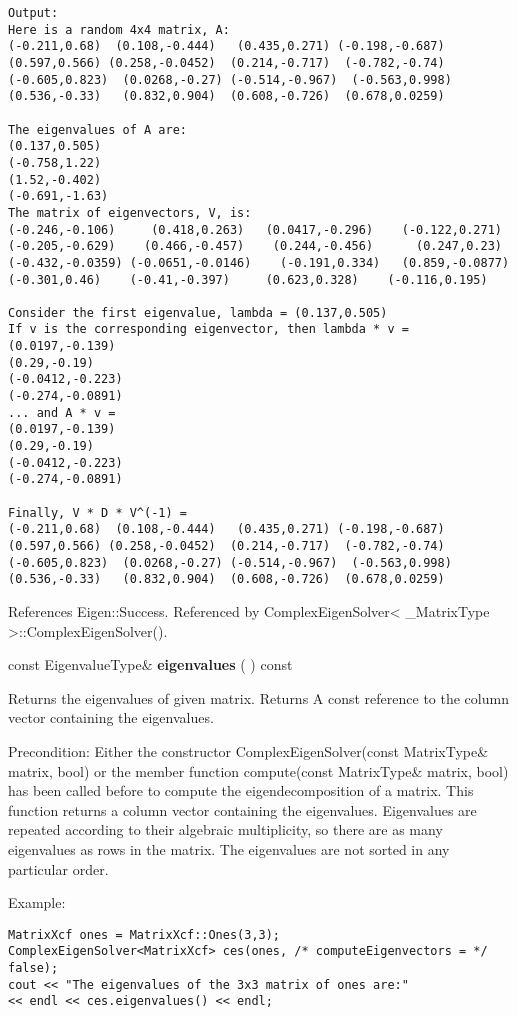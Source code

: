 \begin{verbatim}
Output:
Here is a random 4x4 matrix, A:
(-0.211,0.68)  (0.108,-0.444)   (0.435,0.271) (-0.198,-0.687)
(0.597,0.566) (0.258,-0.0452)  (0.214,-0.717)  (-0.782,-0.74)
(-0.605,0.823)  (0.0268,-0.27) (-0.514,-0.967)  (-0.563,0.998)
(0.536,-0.33)   (0.832,0.904)  (0.608,-0.726)  (0.678,0.0259)

The eigenvalues of A are:
(0.137,0.505)
(-0.758,1.22)
(1.52,-0.402)
(-0.691,-1.63)
The matrix of eigenvectors, V, is:
(-0.246,-0.106)     (0.418,0.263)   (0.0417,-0.296)    (-0.122,0.271)
(-0.205,-0.629)    (0.466,-0.457)    (0.244,-0.456)      (0.247,0.23)
(-0.432,-0.0359) (-0.0651,-0.0146)    (-0.191,0.334)   (0.859,-0.0877)
(-0.301,0.46)    (-0.41,-0.397)     (0.623,0.328)    (-0.116,0.195)

Consider the first eigenvalue, lambda = (0.137,0.505)
If v is the corresponding eigenvector, then lambda * v = 
(0.0197,-0.139)
(0.29,-0.19)
(-0.0412,-0.223)
(-0.274,-0.0891)
... and A * v = 
(0.0197,-0.139)
(0.29,-0.19)
(-0.0412,-0.223)
(-0.274,-0.0891)

Finally, V * D * V^(-1) = 
(-0.211,0.68)  (0.108,-0.444)   (0.435,0.271) (-0.198,-0.687)
(0.597,0.566) (0.258,-0.0452)  (0.214,-0.717)  (-0.782,-0.74)
(-0.605,0.823)  (0.0268,-0.27) (-0.514,-0.967)  (-0.563,0.998)
(0.536,-0.33)   (0.832,0.904)  (0.608,-0.726)  (0.678,0.0259)
\end{verbatim}	

References Eigen::Success.
Referenced by ComplexEigenSolver< \_MatrixType >::ComplexEigenSolver().



\vspace{0.3cm}
const EigenvalueType\& \textbf{eigenvalues}  ( )  const 

Returns the eigenvalues of given matrix. 
Returns A const reference to the column vector containing the eigenvalues.

Precondition: Either the constructor ComplexEigenSolver(const MatrixType\& matrix, bool) or the member function compute(const MatrixType\& matrix, bool) has been called before to compute the eigendecomposition of a matrix.
This function returns a column vector containing the eigenvalues. Eigenvalues are repeated according to their algebraic multiplicity, so there are as many eigenvalues as rows in the matrix. The eigenvalues are not sorted in any particular order.


Example:
\begin{lstlisting}
MatrixXcf ones = MatrixXcf::Ones(3,3);
ComplexEigenSolver<MatrixXcf> ces(ones, /* computeEigenvectors = */ false);
cout << "The eigenvalues of the 3x3 matrix of ones are:"
<< endl << ces.eigenvalues() << endl;
\end{lstlisting}		

